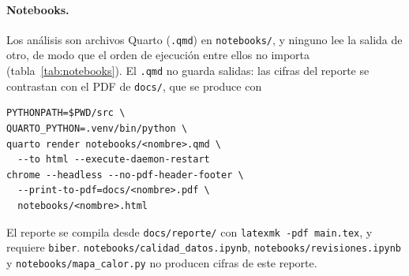 \paragraph{Notebooks.} Los análisis son archivos Quarto (\texttt{.qmd}) en
\texttt{notebooks/}, y ninguno lee la salida de otro, de modo que el orden de
ejecución entre ellos no importa (tabla~\ref{tab:notebooks}). El \texttt{.qmd} no guarda salidas: las
cifras del reporte se contrastan con el PDF de \texttt{docs/}, que se produce con
\begingroup\footnotesize
\begin{verbatim}
PYTHONPATH=$PWD/src \
QUARTO_PYTHON=.venv/bin/python \
quarto render notebooks/<nombre>.qmd \
  --to html --execute-daemon-restart
chrome --headless --no-pdf-header-footer \
  --print-to-pdf=docs/<nombre>.pdf \
  notebooks/<nombre>.html
\end{verbatim}
\endgroup
\noindent El reporte se compila desde \texttt{docs/reporte/} con
\texttt{latexmk -pdf main.tex}, y requiere \texttt{biber}.
\texttt{notebooks/calidad\_datos.ipynb}, \texttt{notebooks/revisiones.ipynb} y
\texttt{notebooks/mapa\_calor.py} no producen cifras de este reporte.

